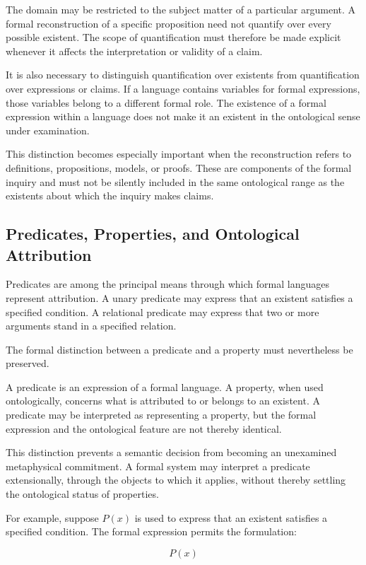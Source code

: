 The domain may be restricted
to the subject matter of
a particular argument.
A formal reconstruction
of a specific proposition
need not quantify over
every possible existent.
The scope of quantification
must therefore be made
explicit whenever it affects
the interpretation or
validity of a claim.

It is also necessary
to distinguish quantification
over existents from
quantification over expressions
or claims. If a language
contains variables for
formal expressions, those
variables belong to a
different formal role.
The existence of a formal
expression within a language
does not make it an existent
in the ontological sense
under examination.

This distinction becomes
especially important when
the reconstruction refers
to definitions, propositions,
models, or proofs. These
are components of the
formal inquiry and must
not be silently included
in the same ontological
range as the existents
about which the inquiry
makes claims.

\subsection{Predicates, Properties, and Ontological Attribution}

Predicates are among
the principal means
through which formal
languages represent
attribution. A unary
predicate may express
that an existent satisfies
a specified condition.
A relational predicate
may express that two
or more arguments stand
in a specified relation.

The formal distinction
between a predicate
and a property must
nevertheless be preserved.

A predicate is an
expression of a formal
language. A property,
when used ontologically,
concerns what is attributed
to or belongs to an existent.
A predicate may be
interpreted as representing
a property, but the
formal expression and
the ontological feature
are not thereby identical.

This distinction prevents
a semantic decision
from becoming an
unexamined metaphysical
commitment. A formal
system may interpret
a predicate extensionally,
through the objects
to which it applies,
without thereby settling
the ontological status
of properties.

For example, suppose
\(P(x)\) is used to
express that an existent
satisfies a specified
condition. The formal
expression permits
the formulation:

\[
P(x)
\]

